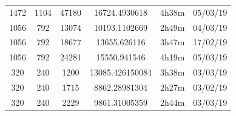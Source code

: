 \documentclass[11pt,a4paper]{report}
\begin{document}
\begin{itemize}
\begin{center}
\begin{tabular}{ c c c | c c c }
  1472 & 1104 & 47180 & 16724.4930618 & 4h38m & 05/03/19 \\
  1056 & 792 & 13074 & 10193.1102669 & 2h49m & 04/03/19 \\
  1056 & 792 & 18677 & 13655.626116 & 3h47m & 17/02/19 \\
  1056 & 792 & 24281 & 15550.941546 & 4h19m & 05/03/19 \\
  320 & 240 & 1200 & 13085.426150084 & 3h38m & 03/03/19 \\
  320 & 240 & 1715 & 8862.28981304 & 2h27m & 03/02/19 \\
  320 & 240 & 2229 & 9861.31005359 & 2h44m & 03/03/19 \\
  \end{tabular}
  \end{center}
\end{itemize}

\newpage
\end{document}
